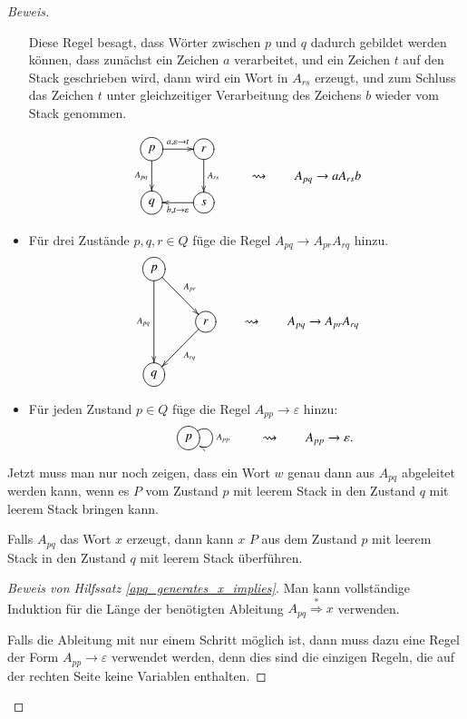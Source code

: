 \begin{proof}[Beweis]
\begin{itemize}
Diese Regel besagt, dass Wörter zwischen $p$ und $q$ dadurch gebildet
werden können, dass zunächst ein Zeichen $a$ verarbeitet, und
ein Zeichen $t$ auf den Stack geschrieben wird, dann wird ein Wort
in $A_{rs}$ erzeugt, und zum Schluss das Zeichen $t$ unter
gleichzeitiger Verarbeitung des Zeichens $b$ wieder vom Stack
genommen.

\[
\begin{gathered}
\entrymodifiers={++[o][F]}
\xymatrix{
{p}      \ar[r]^{a,\varepsilon\to t} \ar[d]_{A_{pq}}
	&{r}\ar[d]^{A_{rs}}
\\
{q}
	&{s}\ar[l]^{b,t\to\varepsilon}
}
\end{gathered}
\qquad\rightsquigarrow\qquad A_{pq}\to aA_{rs}b
\]


\item Für drei Zustände $p,q,r\in Q$ füge die Regel 
$A_{pq}\to A_{pr}A_{rq}$ hinzu.
\[
\begin{gathered}
\entrymodifiers={++[o][F]}
\xymatrix{
{p}\ar[dr]^{A_{pr}}\ar[dd]_{A_{pq}}
\\
*+\txt{}
	&{r}\ar[dl]^{A_{rq}}
\\
{q}
}
\end{gathered}
\qquad\rightsquigarrow\qquad A_{pq}\to A_{pr}A_{rq}
\]
\item Für jeden Zustand $p\in Q$ füge die Regel $A_{pp}\to \varepsilon$
hinzu:
\[
\begin{gathered}
\entrymodifiers={++[o][F]}
\xymatrix{
*+\txt{}
	&{p} \ar@(ur,dr)^{A_{pp}}
}
\end{gathered}
\qquad\rightsquigarrow\qquad
A_{pp}\to\varepsilon.
\]
\end{itemize}
Jetzt muss man nur noch zeigen, dass ein Wort $w$ genau dann aus $A_{pq}$
abgeleitet werden kann, wenn es $P$ vom Zustand $p$ mit leerem Stack
in den Zustand $q$ mit leerem Stack bringen kann.


\begin{hilfssatz}\label{apq_generates_x_implies}
Falls $A_{pq}$ das Wort $x$ erzeugt, dann kann $x$ $P$ aus dem Zustand
$p$ mit leerem Stack in den Zustand $q$ mit leerem Stack überführen.
\end{hilfssatz}

\begin{proof}[Beweis von Hilfssatz \ref{apq_generates_x_implies}]
Man kann vollständige Induktion für die Länge der be\-nötigten 
Ableitung $A_{pq}\overset{*}{\Rightarrow} x$ verwenden.

Falls die Ableitung mit nur einem Schritt möglich ist, dann muss
dazu eine Regel der Form $A_{pp}\to\varepsilon$ verwendet werden,
denn dies sind die einzigen Regeln, die auf der rechten Seite
keine Variablen enthalten.


\end{proof}
\end{proof}

